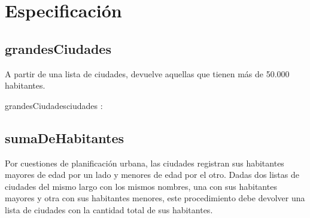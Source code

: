 \documentclass[10pt,a4paper]{article}
\begin{document}

\maketitle

\section{Especificación}

\subsection{grandesCiudades}

A partir de una lista de ciudades, devuelve aquellas que tienen más de 50.000 habitantes.

\vspace{2mm}  %

\begin{proc}{grandesCiudades}{\In ciudades : }{}
\end{proc}


\vspace{2mm}


\vspace{4mm}

\subsection{sumaDeHabitantes}

Por cuestiones de planificación urbana, las ciudades registran sus habitantes mayores de edad por un lado y menores de edad por el otro. Dadas dos listas de ciudades del mismo largo con los mismos nombres, una con sus habitantes mayores y otra con sus habitantes menores, este procedimiento debe devolver una lista de ciudades con la cantidad total de sus habitantes.
\end{document}
